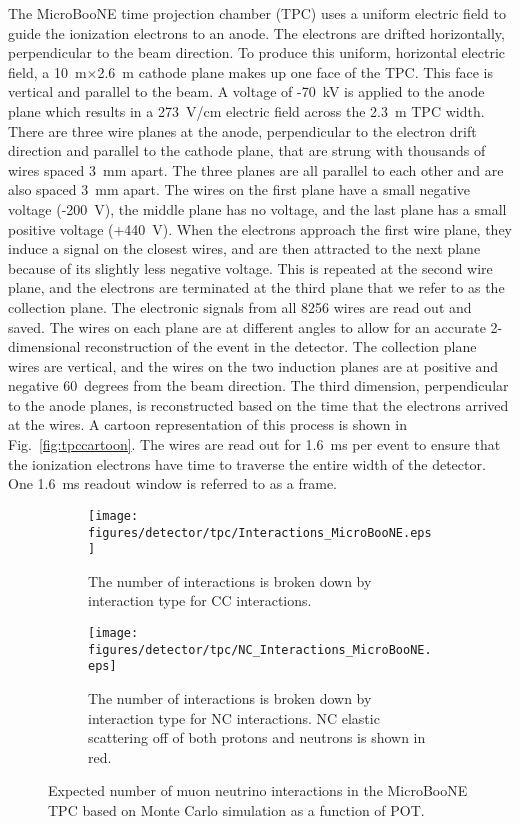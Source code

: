   The MicroBooNE time projection chamber (TPC) uses a uniform electric field to
  guide the ionization electrons to an anode. The electrons are drifted
  horizontally, perpendicular to the beam direction. To produce this uniform,
  horizontal electric field, a 10~m$\times$2.6~m cathode plane makes up one
  face of the TPC. This face is vertical and parallel to the beam. A voltage of
  -70~kV is applied to the anode plane which results in a 273~V/cm electric
  field across the 2.3~m TPC width.  There are three wire planes at the anode,
  perpendicular to the electron drift direction and parallel to the cathode
  plane, that are strung with thousands of wires spaced 3~mm apart.  The three
  planes are all parallel to each other and are also spaced 3~mm apart.  The
  wires on the first plane have a small negative voltage (-200~V), the middle
  plane has no voltage, and the last plane has a small positive voltage
  (+440~V). When the electrons approach the first wire plane, they induce a
  signal on the closest wires, and are then attracted to the next plane because
  of its slightly less negative voltage. This is repeated at the second wire
  plane, and the electrons are terminated at the third plane that we refer to
  as the collection plane. The electronic signals from all 8256 wires are read
  out and saved. The wires on each plane are at different angles to allow for
  an accurate 2-dimensional reconstruction of the event in the detector. The
  collection plane wires are vertical, and the wires on the two induction
  planes are at positive and negative 60~degrees from the beam direction. The
  third dimension, perpendicular to the anode planes, is reconstructed based on
  the time that the electrons arrived at the wires. A cartoon representation of
  this process is shown in Fig.~\ref{fig:tpccartoon}. The wires are read out
  for 1.6~ms per event to ensure that the ionization electrons have time to
  traverse the entire width of the detector. One 1.6~ms readout window is
  referred to as a frame.

  \begin{figure}[h]
    \centering
    \begin{subfigure}[t]{2.5in}
      \texttt{[image: figures/detector/tpc/Interactions\_MicroBooNE.eps]}
      \caption{The number of interactions is broken down by interaction type
      for CC interactions.}
      \label{fig:interactionsal}
    \end{subfigure}
    \hspace{2pt}
    \begin{subfigure}[t]{2.5in}
      \texttt{[image: figures/detector/tpc/NC\_Interactions\_MicroBooNE.eps]}
      \caption{The number of interactions is broken down by interaction type
      for NC interactions. NC elastic scattering off of both protons and
      neutrons is shown in red.}
      \label{fig:interactionsnc}
    \end{subfigure}
    \caption{Expected number of muon neutrino interactions in the
    MicroBooNE TPC based on Monte Carlo simulation as a function of POT.}
    \label{fig:interactions}
  \end{figure}

